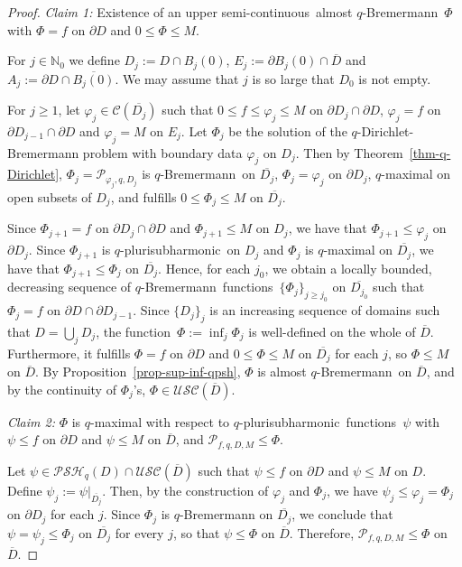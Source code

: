 \documentclass[reqno]{amsart}
\theoremstyle{definition}
\numberwithin{equation}{section}
\newcommand{\nbb}{\mathbb{N}}
\newcommand{\ccal}{\mathcal{C}}
\newcommand{\pcal}{\mathcal{P}}
\newcommand{\USC}{\mathcal{USC}}
\newcommand{\qbrem}{$q$-Bremermann}
\newcommand{\qpsh}{$q$-pluri\-sub\-harmonic}
\newcommand{\PSH}{\mathcal{PSH}}
\newcommand{\cl}[1]{\overline{#1}}
\newcommand{\usc}{upper semi-continuous}
\newcommand{\fct}{function}
\newcommand{\fcts}{functions}
\newcommand{\cld}{\overline{D}}
\newcommand{\vphi}{\varphi}
\begin{document}
\begin{proof} 

\textit{Claim 1:} Existence of an \usc\ almost \qbrem\ $\Phi$ with $\Phi=f$ on $\partial D$ and $0 \leq \Phi \leq M$.

\medskip

For $j \in \nbb_0$ we define $D_j:=D\cap B_{j}(0)$,  $E_j:=\partial B_{j}(0)\cap \cld$ and $A_j:=\partial D \cap \cl{B_{j}(0)}$. We may assume that $j$ is so large that $D_0$ is not empty.

For $j \geq 1$, let $\vphi_{j} \in \ccal(\cl{D_j})$ such that $ 0 \leq f \leq \vphi_{j}\leq M$ on $\partial D_j \cap \partial D$, $\vphi_{j}=f$ on $\partial D_{j-1}\cap \partial D$ and $\vphi_j=M$ on $E_j$. Let $\Phi_{j}$ be the solution of the $q$-Dirichlet-Bremermann problem with boundary data $\vphi_{j}$ on $D_j$. Then by Theorem~\ref{thm-q-Dirichlet}, $\Phi_j=\pcal_{\vphi_j,q,D_j}$ is \qbrem\ on $\cl{D_j}$, $\Phi_j=\vphi_j$ on $\partial D_j$, $q$-maximal on open subsets of $D_j$, and fulfills $0 \leq \Phi_j \leq M$ on $\cl{D_j}$. 

Since $\Phi_{j+1}=f$ on $\partial D_j\cap \partial D$ and $\Phi_{j+1} \leq M$ on $D_j$, we have that $\Phi_{j+1} \leq \vphi_{j}$ on $\partial D_j$. Since $\Phi_{j+1}$ is \qpsh\ on $D_j$ and $\Phi_{j}$ is $q$-maximal on $\cl{D_j}$, we have that $\Phi_{j+1} \leq \Phi_{j}$ on $\cl{D_j}$. Hence, for each $j_0$, we obtain a locally bounded, decreasing sequence of \qbrem\ \fcts\ $\{\Phi_j\}_{j\geq j_0}$ on $\cl{D_{j_0}}$ such that $\Phi_j=f$ on $\partial D \cap \partial D_{j-1}$. Since $\{D_j\}_{j}$ is an increasing sequence of domains such that $D=\bigcup_{j}D_j$, the \fct\ $\Phi:=\inf_j \Phi_j$ is well-defined on the whole of $\cld$. Furthermore, it fulfills $\Phi=f$ on $\partial D$ and $0\leq\Phi \leq M$ on $\cl{D_j}$ for each $j$, so $\Phi \leq M$ on $\cld$. By Proposition~\ref{prop-sup-inf-qpsh}, $\Phi$ is almost \qbrem\ on $\cld$, and by the continuity of $\Phi_j$'s, $\Phi \in \USC(\cld)$.

\medskip

\textit{Claim 2:} $\Phi$ is $q$-maximal with respect to \qpsh\ \fcts\ $\psi$ with $\psi \leq f$ on $\partial D$ and $\psi \leq M$ on $\cld$, and $\pcal_{f,q,D,M} \leq \Phi$.

\medskip

Let $\psi \in \PSH_q(D)\cap\USC(\cld)$ such that $\psi \leq f$ on $\partial D$ and $\psi \leq M$ on $D$. Define $\psi_j:=\psi|_{\cl{D_j}}$. Then, by the construction of $\vphi_j$ and $\Phi_j$, we have $\psi_j\leq \vphi_j=\Phi_j$ on $\partial D_j$ for each $j$. Since $\Phi_j$ is $q$-Bremermann on $\cl{D_j}$, we conclude that $\psi=\psi_j \leq \Phi_j$ on $\cl{D_j}$ for every $j$, so that $\psi \leq \Phi$ on $\cl{D}$. Therefore, $\pcal_{f,q,D,M} \leq \Phi$ on~$\cld$.




\end{proof}
\end{document}

